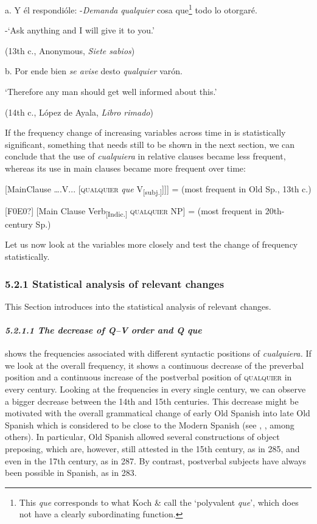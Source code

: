\documentclass[output=paper]{langscibook}
\begin{document}
  a.  Y él respondióle: -\textit{Demanda} \textit{qualquier} cosa que\footnote{This \textit{que} corresponds to what Koch \& \citet[99]{Oesterreicher1990} call the ‘polyvalent \textit{que}’, which does not have a clearly subordinating function.} todo lo otorgaré. 

{}-‘Ask anything and I will give it to you.’

    (13th c., Anonymous, \textit{Siete sabios})

  b.   Por ende bien \textit{se avise} desto \textit{qualquier} varón. 

    ‘Therefore any man should get well informed about this.’

    (14th c., López de Ayala, \textit{Libro rimado})

If the frequency change of increasing variables across time in  is statistically significant, something that needs still to be shown in the next section, we can conclude that the use of \textit{cualquiera} in relative clauses became less frequent, whereas its use in main clauses became more frequent over time:

  [MainClause ….V... [\textsc{qualquier} \textit{que} V\textsubscript{[subj.]}]]] = (most frequent in Old Sp., 13th c.)

  [F0E0?] [Main Clause Verb\textsubscript{[Indic.]} \textsc{qualquier} NP] = (most frequent in 20th-century Sp.)

Let us now look at the variables more closely and test the change of frequency statistically.

\subsubsection{\textbf{5.2.1} \textbf{Statistical} \textbf{analysis} \textbf{of} \textbf{relevant} \textbf{changes}}

This Section introduces into the statistical analysis of relevant changes.

\paragraph{\textit{5.2.1.1 The decrease of Q–V order and Q que}}

 shows the frequencies associated with different syntactic positions of \textit{cualquiera.} If we look at the overall frequency, it shows a continuous decrease of the preverbal position and a continuous increase of the postverbal position of \textsc{qualquier} in every century. Looking at the frequencies in every single century, we can observe a bigger decrease between the 14th and 15th centuries. This decrease might be motivated with the overall grammatical change of early Old Spanish into late Old Spanish which is considered to be close to the Modern Spanish (see \citealt{Ariza1998}, \citealt{Penny1993}, among others). In particular, Old Spanish allowed several constructions of object preposing, which are, however, still attested in the 15th century, as in 285, and even in the 17th century, as in 287. By contrast, postverbal subjects have always been possible in Spanish, as in 283.
\end{document}
